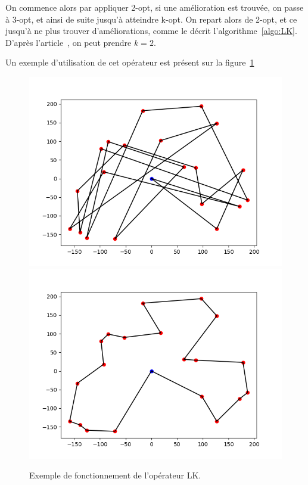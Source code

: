 \documentclass[a4paper,11pt]{article}%
\begin{document}
On commence alors par appliquer 2-opt, si une amélioration est trouvée, on passe à 3-opt, et ainsi de suite jusqu'à atteindre k-opt. 
On repart alors de 2-opt, et ce jusqu'à ne plus trouver d'améliorations, comme le décrit l'algorithme~\ref{algo:LK}.
D'après l'article~\cite{Sorensen_2017}, on peut prendre $k = 2$.
 
Un exemple d'utilisation de cet opérateur est présent sur la figure~\ref{LK}

\begin{figure}
\centering
\includegraphics[scale=0.4]{test4_20_init.png}
\includegraphics[scale=0.4]{test4_20_LKopt.png}

\caption{Exemple de fonctionnement de l'opérateur LK.}
\label{LK}
\end{figure}
\end{document}
